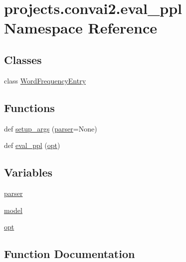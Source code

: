 \hypertarget{namespaceprojects_1_1convai2_1_1eval__ppl}{}\section{projects.\+convai2.\+eval\+\_\+ppl Namespace Reference}
\label{namespaceprojects_1_1convai2_1_1eval__ppl}
\subsection*{Classes}
\begin{DoxyCompactItemize}
\item 
class \hyperlink{classprojects_1_1convai2_1_1eval__ppl_1_1WordFrequencyEntry}{Word\+Frequency\+Entry}
\end{DoxyCompactItemize}
\subsection*{Functions}
\begin{DoxyCompactItemize}
\item 
def \hyperlink{namespaceprojects_1_1convai2_1_1eval__ppl_ac83f1cd52a81f455fc2e726d76e1100e}{setup\+\_\+args} (\hyperlink{namespaceprojects_1_1convai2_1_1eval__ppl_a937a6ecb9699967cb1a2e5a0e6f5de7f}{parser}=None)
\item 
def \hyperlink{namespaceprojects_1_1convai2_1_1eval__ppl_a417da48148c825ed1f5d6897cef06819}{eval\+\_\+ppl} (\hyperlink{namespaceprojects_1_1convai2_1_1eval__ppl_ad3393a540b23f13c7adc9d8b2cf2e4d1}{opt})
\end{DoxyCompactItemize}
\subsection*{Variables}
\begin{DoxyCompactItemize}
\item 
\hyperlink{namespaceprojects_1_1convai2_1_1eval__ppl_a937a6ecb9699967cb1a2e5a0e6f5de7f}{parser}
\item 
\hyperlink{namespaceprojects_1_1convai2_1_1eval__ppl_a81688f1ad5f54db5f1ffa1388412cc97}{model}
\item 
\hyperlink{namespaceprojects_1_1convai2_1_1eval__ppl_ad3393a540b23f13c7adc9d8b2cf2e4d1}{opt}
\end{DoxyCompactItemize}


\subsection{Function Documentation}
\mbox{\label{namespaceprojects_1_1convai2_1_1eval__ppl_a417da48148c825ed1f5d6897cef06819}} 

